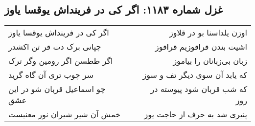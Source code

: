 \begin{center}
\section*{غزل شماره ۱۱۸۳: اگر کی در فرینداش یوقسا یاوز}
\label{sec:1183}
\begin{longtable}{l p{0.5cm} r}
اگر کی در فرینداش یوقسا یاوز
&&
اوزن یلداسنا بو در قلاوز
\\
چپانی برک دت قر تن اکشدر
&&
اشیت بندن قراقوزیم قراقوز
\\
اگر ططسن اگر رومین وگر ترک
&&
زبان بی‌زبانان را بیاموز
\\
سر چوب تری آن گاه گرید
&&
که یابد آن سوی دیگر تف و سوز
\\
چو اسماعیل قربان شو در این عشق
&&
که شب قربان شود پیوسته در روز
\\
خمش آن شیر شیران نور معنیست
&&
پنیری شد به حرف از حاجت یوز
\\
\end{longtable}
\end{center}
